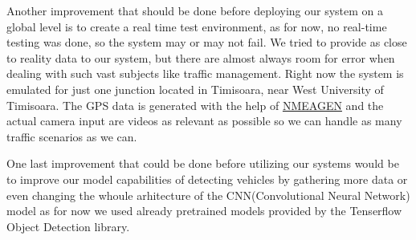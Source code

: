 \documentclass[17pt]{report}
\begin{document}
\indent 
Another improvement that should be done before deploying our system on a 
global level is to create a real time test environment, as for now,
no real-time testing was done, so the system may or may not fail. 
We tried to provide as close to reality data to our system, but there 
are almost always room for error when dealing with such vast subjects
like traffic management. Right now the system is emulated for just
one junction located in Timisoara, near West University of Timisoara.
The GPS data is generated with the help of 
\href{https://www.nmeagen.org/}{NMEAGEN} and the actual camera input 
are videos as relevant as possible so we can handle as many traffic 
scenarios as we can.

\indent
One last improvement that could be done before utilizing our systems 
would be to improve our model capabilities of detecting vehicles by 
gathering more data or even changing the whoule arhitecture of the 
CNN(Convolutional Neural Network) model as for now we used already 
pretrained models provided by the Tenserflow Object Detection library.
\pagebreak
\printbibliography
\end{document}
